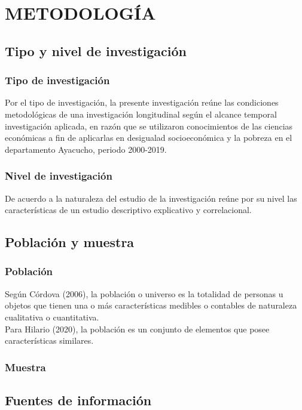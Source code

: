 \section{\large METODOLOGÍA}

\subsection{Tipo y nivel de investigación}

	\subsubsection{Tipo de investigación}

Por el tipo de investigación, la presente investigación reúne las condiciones metodológicas de una investigación longitudinal según el alcance temporal investigación aplicada, en razón que se utilizaron conocimientos de las ciencias económicas a fin de aplicarlas en desigualad socioeconómica y la pobreza en el departamento Ayacucho, periodo 2000-2019.
	
	\subsubsection{Nivel de investigación}
De acuerdo a la naturaleza del estudio de la investigación reúne por su nivel las características de un estudio descriptivo explicativo y correlacional.

\subsection{Población y muestra}
 
	\subsubsection{Población}
	Según Córdova (2006), la población o universo es la totalidad de personas u objetos que tienen una o más características medibles o contables de naturaleza cualitativa o cuantitativa.\\
Para Hilario (2020), la población es un conjunto de elementos que posee características similares.


	\subsubsection{Muestra}
	
\subsection{Fuentes de información}


